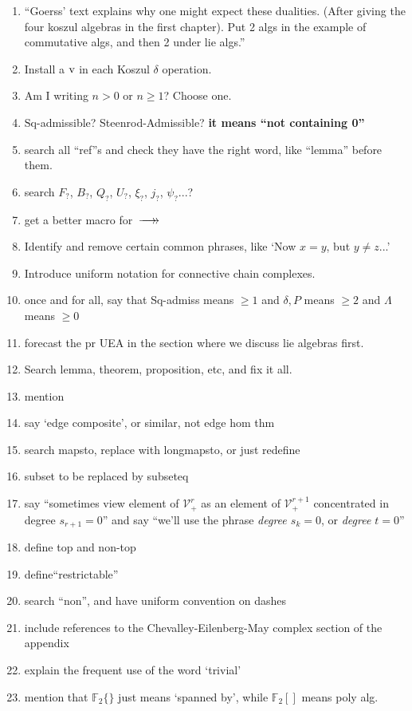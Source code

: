 \documentclass[11pt]{amsart}
\theoremstyle{plain}
\theoremstyle{definition}
\renewcommand{\to}{\longrightarrow}
\newcommand{\calV}{\mathcal{V}}
\theoremstyle{plain}
\newcommand{\vect}[2]{\calV^{#1}_{#2}}
\newcommand{\epi}{{\,\makebox[0cm][l]{\ensuremath\to}\to}}
\newcommand{\Sq}{\mathrm{Sq}}
\newcommand{\F}{\mathbb{F}}
\begin{document}
\begin{todolist}
\begin{enumerate}
\item 
``Goerss' text explains why one might expect these dualities. (After giving the four koszul algebras in the first chapter). Put 2 algs in the example of commutative algs, and then 2 under lie algs.''
\item Install a $\textup{v}$ in each Koszul $\delta$ operation.
\item Am I writing $n>0$ or $n\geq1$? Choose one.
\item $\Sq$-admissible? Steenrod-Admissible? \textbf{it means ``not containing 0''}
\item search all ``ref''s and check they have the right word, like ``lemma'' before them.
\item search $F_?$, $B_?$, $Q_?$, $U_?$, $\xi_?$, $j_?$, $\psi_?$...?
\item get a better macro for $\epi$
\item Identify and remove certain common phrases, like `Now $x=y$, but $y\neq z$...'
\item Introduce uniform notation for connective chain complexes.
\item once and for all, say that Sq-admiss means $\geq1$ and $\delta,P$ means $\geq2$ and $\Lambda$ means $\geq0$
\item forecast the pr UEA in the section where we discuss lie algebras first.
\item Search lemma, theorem, proposition, etc, and fix it all.
\item mention %
\item say `edge composite', or similar, not edge hom thm
\item search mapsto, replace with longmapsto, or just redefine
\item subset to be replaced by subseteq
\item say ``sometimes view element of $\vect{r}{+}$ as an element of $\vect{r+1}{+}$ concentrated in degree $s_{r+1}=0$'' and say ``we'll use the phrase \emph{degree $s_k=0$}, or \emph{degree $t=0$}''
\item define top and non-top
\item define``restrictable''
\item search ``non'', and have uniform convention on dashes
\item include references to the Chevalley-Eilenberg-May complex section of the appendix
\item explain the frequent use of the word `trivial'
\item mention that $\F_2\{\}$ just means `spanned by', while $\F_2[]$ means poly alg.

\end{enumerate}
\end{todolist}
\end{document}
